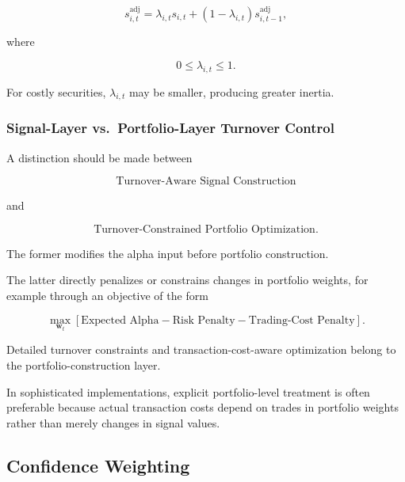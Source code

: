 \documentclass[11pt,a4paper]{article}
\begin{document}
\begin{equation}
\boxed{
s_{i,t}^{\mathrm{adj}}
=
\lambda_{i,t}s_{i,t}
+
(1-\lambda_{i,t})
s_{i,t-1}^{\mathrm{adj}},
}
\end{equation}

where

\begin{equation}
0\leq\lambda_{i,t}\leq1.
\end{equation}

For costly securities, $\lambda_{i,t}$ may be smaller, producing greater
inertia.


\subsubsection{Signal-Layer vs.\ Portfolio-Layer Turnover Control}

A distinction should be made between

\begin{equation}
\boxed{
\text{Turnover-Aware Signal Construction}
}
\end{equation}

and

\begin{equation}
\boxed{
\text{Turnover-Constrained Portfolio Optimization}.
}
\end{equation}

The former modifies the alpha input before portfolio construction.

The latter directly penalizes or constrains changes in portfolio weights, for
example through an objective of the form

\begin{equation}
\max_{\mathbf{w}_t}
\left[
\text{Expected Alpha}
-
\text{Risk Penalty}
-
\text{Trading-Cost Penalty}
\right].
\end{equation}

Detailed turnover constraints and transaction-cost-aware optimization belong to
the portfolio-construction layer.

In sophisticated implementations, explicit portfolio-level treatment is often
preferable because actual transaction costs depend on trades in portfolio
weights rather than merely changes in signal values.


\subsection{Confidence Weighting}
\label{subsec:confidence_weighting}
\end{document}
